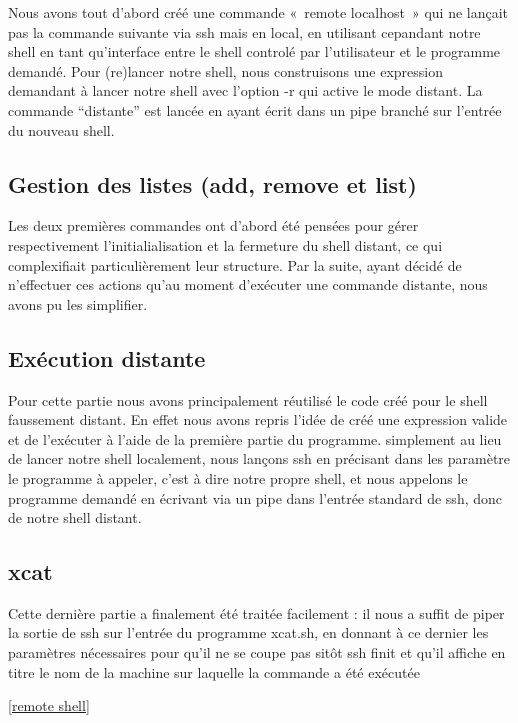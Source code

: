 \documentclass[12pt]{article}
\begin{document}
Nous avons tout d'abord créé une commande «~remote localhost~» qui ne lançait pas la commande
suivante via ssh mais en local, en utilisant cepandant notre shell en tant qu'interface entre le shell
controlé par l'utilisateur et le programme demandé. Pour (re)lancer notre shell, nous construisons une
expression demandant à lancer notre shell avec l'option -r qui active le mode distant. La commande
“distante” est lancée en ayant écrit dans un pipe branché sur l'entrée du nouveau shell.

\subsection{Gestion des listes (add, remove et list)}

Les deux premières commandes ont d'abord été pensées pour gérer respectivement l'initialialisation
et la fermeture du shell distant, ce qui complexifiait particulièrement leur structure. Par la
suite, ayant décidé de n'effectuer ces actions qu'au moment d'exécuter une commande distante, nous
avons pu les simplifier.

\subsection{Exécution distante}

Pour cette partie nous avons principalement réutilisé le code créé pour le shell faussement
distant. En effet nous avons repris l'idée de créé une expression valide et de l'exécuter à l'aide
de la première partie du programme. simplement au lieu de lancer notre shell localement, nous lançons ssh en
précisant dans les paramètre le programme à appeler, c'est à dire notre propre shell, et nous appelons
le programme demandé en écrivant via un pipe dans l'entrée standard de ssh, donc de notre shell distant.

\subsection{xcat}

Cette dernière partie a finalement été traitée facilement : il nous a suffit de piper la sortie de ssh
sur l'entrée du programme xcat.sh, en donnant à ce dernier les paramètres nécessaires pour qu'il ne se coupe pas
sitôt ssh finit et qu'il affiche en titre le nom de la machine sur laquelle la commande a été exécutée

\ref{remote shell}
\end{document}
